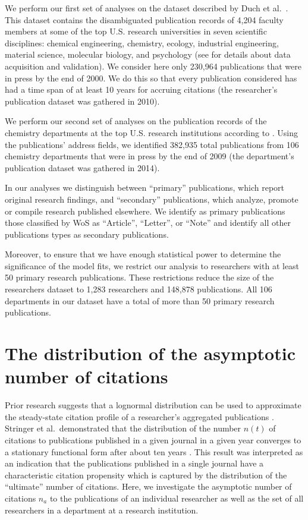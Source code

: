 We perform our first set of analyses on the dataset described by Duch et al.\ \cite{Duch2012}. This dataset contains the disambiguated publication records of 4,204 faculty members at some of the top U.S. research universities in seven scientific disciplines: chemical engineering, chemistry, ecology, industrial engineering, material science, molecular biology, and psychology (see \cite{Duch2012} for details about data acquisition and validation). We consider here only 230,964 publications that were in press by the end of 2000. We do this so that every publication considered has had a time span of at least 10 years for accruing citations \cite{Stringer2010} (the researcher's publication dataset was gathered in 2010).

We perform our second set of analyses on the publication records of the chemistry departments at the top U.S. research institutions according to \cite{wiki}. Using the publications' address fields, we identified 382,935 total publications from 106 chemistry departments that were in press by the end of 2009 (the department's publication dataset was gathered in 2014).

In our analyses we distinguish between ``primary'' publications, which report original research findings, and ``secondary'' publications, which analyze, promote or compile research published elsewhere. We identify as primary publications those classified by WoS as ``Article'', ``Letter'', or ``Note'' and identify all other publications types as secondary publications.

Moreover, to ensure that we have enough statistical power to determine the significance of the model fits, we restrict our analysis to researchers with at least 50 primary research publications. These restrictions reduce the size of the researchers dataset to 1,283 researchers and 148,878 publications. All 106 departments in our dataset have a total of more than 50 primary research publications.


\section{The distribution of the asymptotic number of citations}

Prior research suggests that a lognormal distribution can be used to approximate the steady-state citation profile of a researcher's aggregated publications \cite{Redner2005, Radicchi2008}. Stringer et al.\ demonstrated that the distribution of the number $n(t)$ of citations to publications published in a given journal in a given year converges to a stationary functional form after about ten years \cite{Stringer2008}. This result was interpreted as an indication that the publications published in a single journal have a characteristic citation propensity \cite{Burrell2003a} which is captured by the distribution of the ``ultimate'' number of citations. Here, we investigate the asymptotic number of citations $n_a$ to the publications of an individual researcher as well as the set of all researchers in a department at a research institution.

